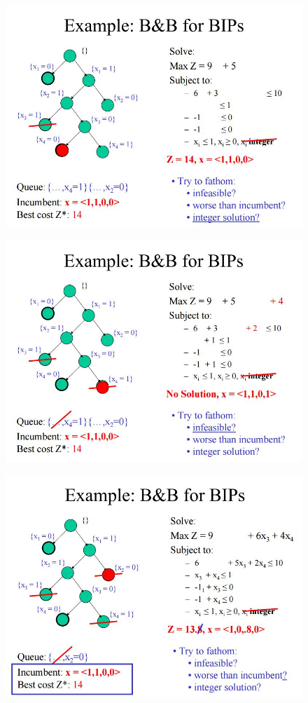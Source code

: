 \documentclass{beamer}
\begin{document}
\begin{frame}
	\begin{figure}
		\centering
		\includegraphics[width=1.0\linewidth]{BB-BIP/BB-BIP25}
	\end{figure}
\end{frame}
\begin{frame}
	\begin{figure}
		\centering
		\includegraphics[width=1.0\linewidth]{BB-BIP/BB-BIP26}
	\end{figure}
\end{frame}
\begin{frame}
	\begin{figure}
		\centering
		\includegraphics[width=1.0\linewidth]{BB-BIP/BB-BIP27}
	\end{figure}
\end{frame}
\end{document}
